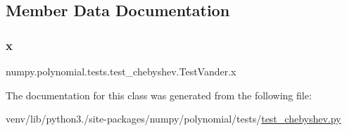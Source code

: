 \subsection{Member Data Documentation}
\mbox{\label{classnumpy_1_1polynomial_1_1tests_1_1test__chebyshev_1_1TestVander_a42b983bcafda009c052e07043fabb262}} 
\subsubsection{\texorpdfstring{x}{x}}
{\footnotesize\ttfamily numpy.\+polynomial.\+tests.\+test\+\_\+chebyshev.\+Test\+Vander.\+x\hspace{0.3cm}{\ttfamily [static]}}



The documentation for this class was generated from the following file\+:\begin{DoxyCompactItemize}
\item 
venv/lib/python3./site-\/packages/numpy/polynomial/tests/\hyperlink{test__chebyshev_8py}{test\+\_\+chebyshev.\+py}\end{DoxyCompactItemize}
